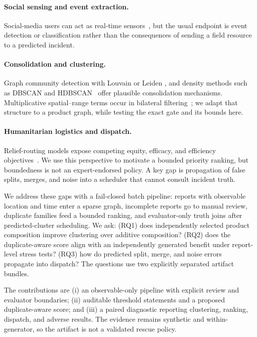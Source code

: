 \documentclass[runningheads]{llncs}
\begin{document}
\paragraph{Social sensing and event extraction.}
Social-media users can act as real-time sensors~\cite{sakaki2010earthquake},
but the usual endpoint is event detection or classification rather than the
consequences of sending a field resource to a predicted incident.

\paragraph{Consolidation and clustering.}
Graph community detection with Louvain or Leiden
\cite{blondel2008louvain,traag2019leiden}, and density methods such as DBSCAN
and HDBSCAN~\cite{ester1996dbscan} offer plausible consolidation mechanisms.
Multiplicative spatial--range
terms occur in bilateral filtering~\cite{tomasi1998bilateral}; we adapt that
structure to a product graph, while testing the exact gate and its bounds here.

\paragraph{Humanitarian logistics and dispatch.}
Relief-routing models expose competing equity, efficacy, and efficiency
objectives~\cite{gralla2014review}.
We use this perspective to motivate a bounded priority ranking, but boundedness
is not an expert-endorsed policy. A key gap is propagation of false splits,
merges, and noise into a scheduler that cannot consult incident truth.

We address these gaps with a fail-closed batch pipeline: reports with
observable location and time enter a sparse graph, incomplete reports go to
manual review, duplicate families feed a bounded ranking, and evaluator-only
truth joins after predicted-cluster scheduling. We ask:
(RQ1) does independently selected product composition improve clustering over
additive composition? (RQ2) does the duplicate-aware score align with an
independently generated benefit under report-level stress tests? (RQ3) how do
predicted split, merge, and noise errors propagate into dispatch? The questions
use two explicitly separated artifact bundles.

The contributions are (i) an observable-only pipeline with explicit review and
evaluator boundaries; (ii) auditable threshold statements and a proposed
duplicate-aware score; and (iii) a paired diagnostic reporting clustering,
ranking, dispatch, and adverse results. The evidence remains synthetic and
within-generator, so the artifact is not a validated rescue policy.
\end{document}
